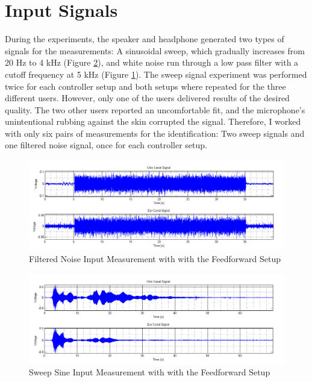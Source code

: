 \section{Input Signals}

During the experiments, the speaker and headphone generated two types of signals for the measurements: A sinusoidal sweep, which gradually increases from 20 Hz to 4 kHz (Figure \ref{fig:sweep}), and white noise run through a low pass filter with a cutoff frequency at 5 kHz (Figure \ref{fig:noise}). The sweep signal experiment was performed twice for each controller setup and both setups where repeated for the three different users. However, only one of the users delivered results of the desired quality. The two other users reported an uncomfortable fit, and the microphone's unintentional rubbing against the skin corrupted the signal. Therefore, I worked with only six pairs of measurements for the identification: Two sweep signals and one filtered noise signal, once for each controller setup.

\begin{figure}[h]
\centering
\includegraphics[width=1.0\textwidth]{pics/Noise}
\caption{Filtered Noise Input Measurement with with the Feedforward Setup}
\label{fig:noise}
\end{figure}

\begin{figure}[h]
\centering
\includegraphics[width=1.0\textwidth]{pics/Sweep}
\caption{Sweep Sine Input Measurement with with the Feedforward Setup}
\label{fig:sweep}
\end{figure}

